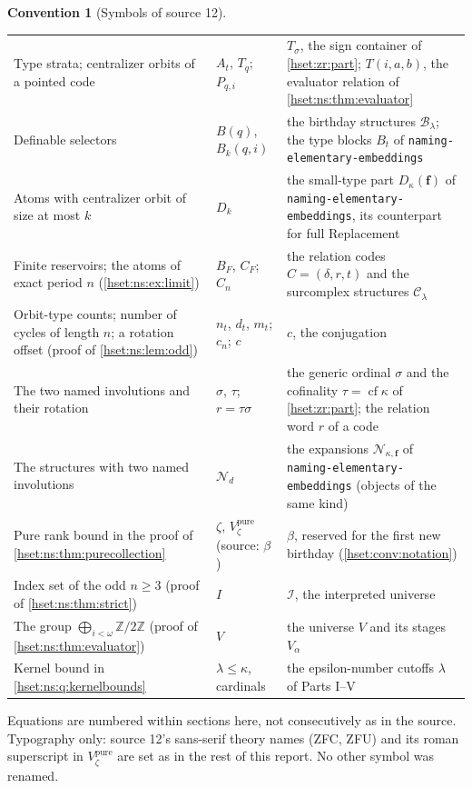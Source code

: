 \documentclass[11pt,letterpaper]{article}
\theoremstyle{definition}
\newtheorem{convention}[convention]{Convention}\aliascntresetthe{convention}
\theoremstyle{remark}
\newcommand{\B}{\mathcal B}
\newcommand{\C}{\mathcal C}
\newcommand{\I}{\mathcal I}
\newcommand{\cf}{\operatorname{cf}}
\newcommand{\repo}[1]{\nolinkurl{#1}}
\newcommand{\Z}{\mathbb Z}
\begin{document}
\begin{convention}[Symbols of source 12]
\begin{center}
\begin{longtable}{@{}P{0.25\textwidth}P{0.24\textwidth}P{0.43\textwidth}@{}}
Type strata; centralizer orbits of a pointed code & $A_t$, $T_q$; $P_{q,i}$ & $T_\sigma$, the sign container of \cref{hset:zr:part}; $T(i,a,b)$, the evaluator relation of \cref{hset:ns:thm:evaluator}\\
Definable selectors & $B(q)$, $B_k(q,i)$ & the birthday structures $\B_\lambda$; the type blocks $B_t$ of \repo{naming-elementary-embeddings}\\
Atoms with centralizer orbit of size at most $k$ & $D_k$ & the small-type part $D_\kappa(\boldsymbol f)$ of \repo{naming-elementary-embeddings}, its counterpart for full Replacement\\
Finite reservoirs; the atoms of exact period $n$ (\cref{hset:ns:ex:limit}) & $B_F$, $C_F$; $C_n$ & the relation codes $C=(\delta,r,t)$ and the surcomplex structures $\C_\lambda$\\
Orbit-type counts; number of cycles of length $n$; a rotation offset (proof of \cref{hset:ns:lem:odd}) & $n_t$, $d_t$, $m_t$; $c_n$; $c$ & $c$, the conjugation\\
The two named involutions and their rotation & $\sigma$, $\tau$; $r=\tau\sigma$ & the generic ordinal $\sigma$ and the cofinality $\tau=\cf\kappa$ of \cref{hset:zr:part}; the relation word $r$ of a code\\
The structures with two named involutions & $\mathcal N_d$ & the expansions $\mathcal N_{\kappa,\boldsymbol f}$ of \repo{naming-elementary-embeddings} (objects of the same kind)\\
Pure rank bound in the proof of \cref{hset:ns:thm:purecollection} & $\zeta$, $V^{\mathrm{pure}}_\zeta$ (source: $\beta$) & $\beta$, reserved for the first new birthday (\cref{hset:conv:notation})\\
Index set of the odd $n\ge3$ (proof of \cref{hset:ns:thm:strict}) & $I$ & $\I$, the interpreted universe\\
The group $\bigoplus_{i<\omega}\Z/2\Z$ (proof of \cref{hset:ns:thm:evaluator}) & $V$ & the universe $V$ and its stages $V_\alpha$\\
Kernel bound in \cref{hset:ns:q:kernelbounds} & $\lambda\le\kappa$, cardinals & the epsilon-number cutoffs $\lambda$ of Parts I--V\\
\bottomrule
\end{longtable}
\end{center}
Equations are numbered within sections here, not consecutively as in the
source. Typography only: source 12's sans-serif theory names (ZFC, ZFU) and its
roman superscript in $V^{\mathrm{pure}}_\zeta$ are set as in the rest of this
report. No other symbol was renamed.
\end{convention}
\end{document}

